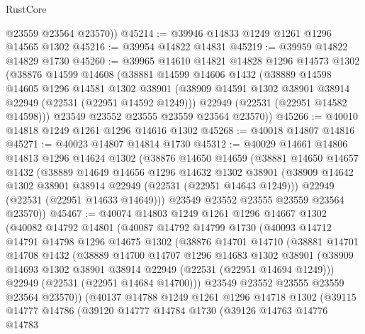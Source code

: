 \begin{lexlean}{RustCore}
\begin{coremodule}
        @23559
        @23564
        @23570))
@45214 := @39946 @14833 @1249 @1261 @1296 @14565 @1302
@45216 := @39954 @14822 @14831
@45219 := @39959 @14822 @14829 @1730
@45260 := @39965
    @14610
    @14821
    @14828
    @1296
    @14573
    @1302
    (@38876
      @14599
      @14608
      (@38881
        @14599
        @14606
        @1432
        (@38889
          @14598
          @14605
          @1296
          @14581
          @1302
          @38901
          (@38909 @14591 @1302 @38901 @38914 @22949 (@22531 (@22951 @14592 @1249)))
          @22949
          (@22531 (@22951 @14582 @14598)))
        @23549
        @23552
        @23555
        @23559
        @23564
        @23570))
@45266 := @40010 @14818 @1249 @1261 @1296 @14616 @1302
@45268 := @40018 @14807 @14816
@45271 := @40023 @14807 @14814 @1730
@45312 := @40029
    @14661
    @14806
    @14813
    @1296
    @14624
    @1302
    (@38876
      @14650
      @14659
      (@38881
        @14650
        @14657
        @1432
        (@38889
          @14649
          @14656
          @1296
          @14632
          @1302
          @38901
          (@38909 @14642 @1302 @38901 @38914 @22949 (@22531 (@22951 @14643 @1249)))
          @22949
          (@22531 (@22951 @14633 @14649)))
        @23549
        @23552
        @23555
        @23559
        @23564
        @23570))
@45467 := @40074
    @14803
    @1249
    @1261
    @1296
    @14667
    @1302
    (@40082
      @14792
      @14801
      (@40087
        @14792
        @14799
        @1730
        (@40093
          @14712
          @14791
          @14798
          @1296
          @14675
          @1302
          (@38876
            @14701
            @14710
            (@38881
              @14701
              @14708
              @1432
              (@38889
                @14700
                @14707
                @1296
                @14683
                @1302
                @38901
                (@38909 @14693 @1302 @38901 @38914 @22949 (@22531 (@22951 @14694 @1249)))
                @22949
                (@22531 (@22951 @14684 @14700)))
              @23549
              @23552
              @23555
              @23559
              @23564
              @23570))
          (@40137
            @14788
            @1249
            @1261
            @1296
            @14718
            @1302
            (@39115
              @14777
              @14786
              (@39120
                @14777
                @14784
                @1730
                (@39126
                  @14763
                  @14776
                  @14783

\end{coremodule}
\end{lexlean}

